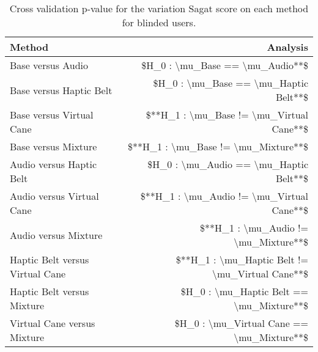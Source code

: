 
\begin{table}[!htb]
\centering
\caption{Cross validation p-value for the variation Sagat score on each method for blinded users.}
\label{tab:lsd_sagat_var}
\begin{tabular}{lr}
\toprule
                         Method &                                        Analysis \\
\midrule
              Base versus Audio &                 \$H\_0 : \textbackslash mu\_Base == \textbackslash mu\_Audio**\$ \\
        Base versus Haptic Belt &           \$H\_0 : \textbackslash mu\_Base == \textbackslash mu\_Haptic Belt**\$ \\
       Base versus Virtual Cane &        \$**H\_1 : \textbackslash mu\_Base != \textbackslash mu\_Virtual Cane**\$ \\
            Base versus Mixture &             \$**H\_1 : \textbackslash mu\_Base != \textbackslash mu\_Mixture**\$ \\
       Audio versus Haptic Belt &          \$H\_0 : \textbackslash mu\_Audio == \textbackslash mu\_Haptic Belt**\$ \\
      Audio versus Virtual Cane &       \$**H\_1 : \textbackslash mu\_Audio != \textbackslash mu\_Virtual Cane**\$ \\
           Audio versus Mixture &            \$**H\_1 : \textbackslash mu\_Audio != \textbackslash mu\_Mixture**\$ \\
Haptic Belt versus Virtual Cane & \$**H\_1 : \textbackslash mu\_Haptic Belt != \textbackslash mu\_Virtual Cane**\$ \\
     Haptic Belt versus Mixture &        \$H\_0 : \textbackslash mu\_Haptic Belt == \textbackslash mu\_Mixture**\$ \\
    Virtual Cane versus Mixture &       \$H\_0 : \textbackslash mu\_Virtual Cane == \textbackslash mu\_Mixture**\$ \\
\bottomrule
\end{tabular}
\end{table}

